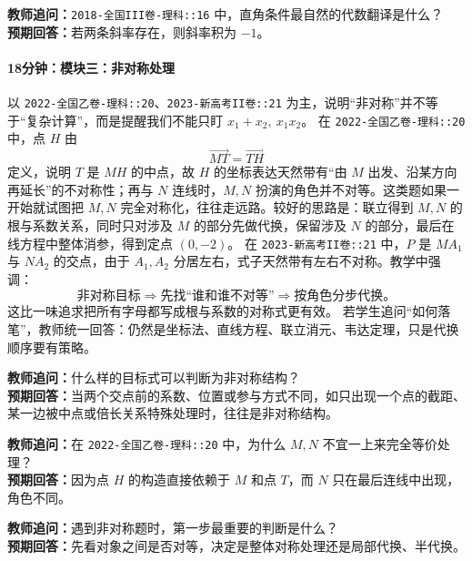 \documentclass[UTF8,a4paper,11pt]{ctexart}
\begin{document}
\noindent\textbf{教师追问：}\texttt{2018-全国III卷-理科::16} 中，直角条件最自然的代数翻译是什么？\\

\textbf{预期回答：}若两条斜率存在，则斜率积为 $-1$。\par

\paragraph{18分钟：模块三：非对称处理}

以 \texttt{2022-全国乙卷-理科::20}、\texttt{2023-新高考II卷::21} 为主，说明“非对称”并不等于“复杂计算”，而是提醒我们不能只盯 $x_1+x_2,\ x_1x_2$。
在 \texttt{2022-全国乙卷-理科::20} 中，点 $H$ 由
\[
\overrightarrow{MT}=\overrightarrow{TH}
\]
定义，说明 $T$ 是 $MH$ 的中点，故 $H$ 的坐标表达天然带有“由 $M$ 出发、沿某方向再延长”的不对称性；再与 $N$ 连线时，$M,N$ 扮演的角色并不对等。这类题如果一开始就试图把 $M,N$ 完全对称化，往往走远路。较好的思路是：联立得到 $M,N$ 的根与系数关系，同时只对涉及 $M$ 的部分先做代换，保留涉及 $N$ 的部分，最后在线方程中整体消参，得到定点 $(0,-2)$。
在 \texttt{2023-新高考II卷::21} 中，$P$ 是 $MA_1$ 与 $NA_2$ 的交点，由于 $A_1,A_2$ 分居左右，式子天然带有左右不对称。教学中强调：
\[
\text{非对称目标} \Rightarrow \text{先找“谁和谁不对等”} \Rightarrow \text{按角色分步代换}\text{。}
\]
这比一味追求把所有字母都写成根与系数的对称式更有效。
若学生追问“如何落笔”，教师统一回答：仍然是坐标法、直线方程、联立消元、韦达定理，只是代换顺序要有策略。

\noindent\textbf{教师追问：}什么样的目标式可以判断为非对称结构？\\

\textbf{预期回答：}当两个交点前的系数、位置或参与方式不同，如只出现一个点的截距、某一边被中点或倍长关系特殊处理时，往往是非对称结构。\par

\noindent\textbf{教师追问：}在 \texttt{2022-全国乙卷-理科::20} 中，为什么 $M,N$ 不宜一上来完全等价处理？\\

\textbf{预期回答：}因为点 $H$ 的构造直接依赖于 $M$ 和点 $T$，而 $N$ 只在最后连线中出现，角色不同。\par

\noindent\textbf{教师追问：}遇到非对称题时，第一步最重要的判断是什么？\\

\textbf{预期回答：}先看对象之间是否对等，决定是整体对称处理还是局部代换、半代换。\par
\end{document}
